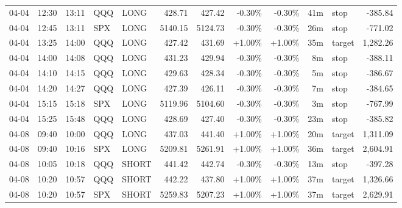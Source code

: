 \documentclass[11pt,a4paper,twoside]{article}
\begin{document}
\begin{center}
\begin{longtable}{>{\color{txtmain}}l l l l l r r r r r >{\color{txtmain}}l r}
04-04 & 12:30 & 13:11 & QQQ & LONG & 428.71 & 427.42 & \textcolor{lossred}{-0.30\%} & \textcolor{lossred}{-0.30\%} & 41m & stop & \textcolor{lossred}{-385.84} \\
04-04 & 12:45 & 13:11 & SPX & LONG & 5140.15 & 5124.73 & \textcolor{lossred}{-0.30\%} & \textcolor{lossred}{-0.30\%} & 26m & stop & \textcolor{lossred}{-771.02} \\
04-04 & 13:25 & 14:00 & QQQ & LONG & 427.42 & 431.69 & \textcolor{wingreen}{+1.00\%} & \textcolor{wingreen}{+1.00\%} & 35m & target & \textcolor{wingreen}{1,282.26} \\
04-04 & 14:00 & 14:08 & QQQ & LONG & 431.23 & 429.94 & \textcolor{lossred}{-0.30\%} & \textcolor{lossred}{-0.30\%} & 8m & stop & \textcolor{lossred}{-388.11} \\
04-04 & 14:10 & 14:15 & QQQ & LONG & 429.63 & 428.34 & \textcolor{lossred}{-0.30\%} & \textcolor{lossred}{-0.30\%} & 5m & stop & \textcolor{lossred}{-386.67} \\
04-04 & 14:20 & 14:27 & QQQ & LONG & 427.39 & 426.11 & \textcolor{lossred}{-0.30\%} & \textcolor{lossred}{-0.30\%} & 7m & stop & \textcolor{lossred}{-384.65} \\
04-04 & 15:15 & 15:18 & SPX & LONG & 5119.96 & 5104.60 & \textcolor{lossred}{-0.30\%} & \textcolor{lossred}{-0.30\%} & 3m & stop & \textcolor{lossred}{-767.99} \\
04-04 & 15:25 & 15:48 & QQQ & LONG & 428.69 & 427.40 & \textcolor{lossred}{-0.30\%} & \textcolor{lossred}{-0.30\%} & 23m & stop & \textcolor{lossred}{-385.82} \\
04-08 & 09:40 & 10:00 & QQQ & LONG & 437.03 & 441.40 & \textcolor{wingreen}{+1.00\%} & \textcolor{wingreen}{+1.00\%} & 20m & target & \textcolor{wingreen}{1,311.09} \\
04-08 & 09:40 & 10:16 & SPX & LONG & 5209.81 & 5261.91 & \textcolor{wingreen}{+1.00\%} & \textcolor{wingreen}{+1.00\%} & 36m & target & \textcolor{wingreen}{2,604.91} \\
04-08 & 10:05 & 10:18 & QQQ & SHORT & 441.42 & 442.74 & \textcolor{lossred}{-0.30\%} & \textcolor{lossred}{-0.30\%} & 13m & stop & \textcolor{lossred}{-397.28} \\
04-08 & 10:20 & 10:57 & QQQ & SHORT & 442.22 & 437.80 & \textcolor{wingreen}{+1.00\%} & \textcolor{wingreen}{+1.00\%} & 37m & target & \textcolor{wingreen}{1,326.66} \\
04-08 & 10:20 & 10:57 & SPX & SHORT & 5259.83 & 5207.23 & \textcolor{wingreen}{+1.00\%} & \textcolor{wingreen}{+1.00\%} & 37m & target & \textcolor{wingreen}{2,629.91} \\

\end{longtable}
\end{center}
\end{document}
